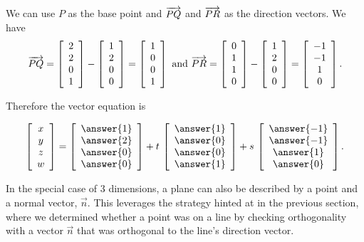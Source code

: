 \documentclass{ximera}
\begin{document}
\begin{solution}
  We can use $P$ as the base point and $\longvect{PQ}$ and
  $\longvect{PR}$ as the direction vectors. We have
  \begin{equation*}
    \longvect{PQ} =
    \startmat{c} 2\\2\\0\\1 \stopmat
    - \startmat{c} 1\\2\\0\\0 \stopmat
    = \startmat{c} 1\\0\\0\\1 \stopmat
    \quad\mbox{and}\quad
    \longvect{PR} =
    \startmat{c} 0\\1\\1\\0 \stopmat
    - \startmat{c} 1\\2\\0\\0 \stopmat
    = \startmat{c} -1\\-1\\1\\0 \stopmat.
  \end{equation*}

  Therefore the vector equation is

  \begin{equation*}
    \startmat{c} x\\y\\z\\w \stopmat
    = \startmat{c} \answer{1}\\\answer{2}\\\answer{0}\\\answer{0} \stopmat
    + t\,\startmat{c} \answer{1}\\\answer{0}\\\answer{0}\\\answer{1} \stopmat
    + s\,\startmat{c} \answer{-1}\\\answer{-1}\\\answer{1}\\\answer{0} \stopmat.
\end{equation*}
\end{solution}

In the special case of 3 dimensions, a plane can also be described by
a point and a normal vector, $\vec{n}$. This leverages the strategy hinted at in the previous section, where we determined whether a point was on a line by checking orthogonality with a vector $\vec{n}$ that was orthogonal to the line's direction vector.
\end{document}
